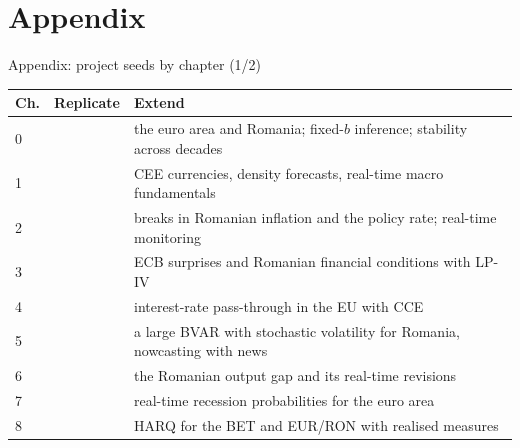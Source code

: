 \section{Appendix}

\begin{frame}{Appendix: project seeds by chapter (1/2)}
\hypertarget{atsapp1}{}
\itemsize{\small}
\begin{center}
\scriptsize
\begin{tabular}{l>{\raggedright\arraybackslash}p{5.0cm}>{\raggedright\arraybackslash}p{6.6cm}}
\toprule
\textbf{Ch.} & \textbf{Replicate} & \textbf{Extend} \\
\midrule
0 & {} & the euro area and Romania; fixed-$b$ inference; stability across decades \\
1 & {} & CEE currencies, density forecasts, real-time macro fundamentals \\
2 & {} & breaks in Romanian inflation and the policy rate; real-time monitoring \\
3 & {} & ECB surprises and Romanian financial conditions with LP-IV \\
4 & {} & interest-rate pass-through in the EU with CCE \\
5 & {} & a large BVAR with stochastic volatility for Romania, nowcasting with news \\
6 & {} & the Romanian output gap and its real-time revisions \\
7 & {} & real-time recession probabilities for the euro area \\
8 & {} & HARQ for the BET and EUR/RON with realised measures \\
\bottomrule
\end{tabular}
\end{center}
\end{frame}

